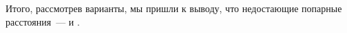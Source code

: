 \begin{itemize}
Итого, рассмотрев варианты, мы пришли к выводу, что недостающие попарные
расстояния~---  и .

%
%
%
%
%
%
%
%
%

\end{itemize}